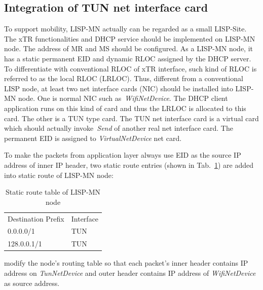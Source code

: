 \subsection{Integration of TUN net interface card}
\label{subsec:tundevice}
To support mobility, LISP-MN actually can be regarded as a small LISP-Site. The xTR functionalities and DHCP service should be implemented on LISP-MN node. The address of MR and MS should be configured. As a LISP-MN node, it has a static permanent EID and dynamic RLOC assigned by the DHCP server. To differentiate with conventional RLOC of xTR interface, such kind of RLOC is referred to as the local RLOC (LRLOC). Thus, different from a conventional LISP node, at least two net interface cards (NIC) should be installed into LISP-MN node. One is normal NIC such as~\emph{WifiNetDevice}. The DHCP client application runs on this kind of card and thus the LRLOC is allocated to this card. The other is a TUN type card. The TUN net interface card is a virtual card which should actually invoke~\emph{Send} of another real net interface card. The permanent EID is assigned to \emph{VirtualNetDevice} net card. 

To make the packets from application layer always use EID as the source IP address of inner IP header, two static route entries (shown in Tab.~\ref{tab:static-route-table}) are added into static route of LISP-MN node:
\begin{table}[]
	\centering
	\caption{Static route table of LISP-MN node}
	\label{tab:static-route-table}
	\begin{tabular}{ll}
		Destination Prefix & Interface \\
		0.0.0.0/1          & TUN       \\
		128.0.0.1/1        & TUN      
	\end{tabular}
\end{table}

modify the node's routing table so that each packet's inner header contains IP address on \emph{TunNetDevice} and outer header contains IP address of \emph{WifiNetDevice} as source address.

